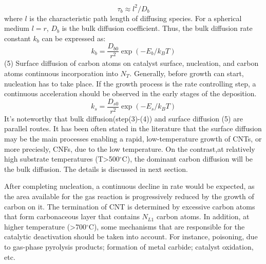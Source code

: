 \begin{equation}
\tau_{b} \approx l^{2} / D_{b}
\tag{3.2.5}
\end{equation}
where $l$ is the characteristic path length of diﬀusing species. For a spherical medium $l=r$,  $D_{b}$ is the bulk diﬀusion coefficient. Thus, the bulk diﬀusion rate constant $k_{b}$ can be expressed as:
\begin{equation}
k_{b}=\frac{D_{b 0}}{r^{2}} \exp \left(-E_{b} / k_{B} T\right)
\tag{3.2.6}
\end{equation}
(5) Surface diﬀusion of carbon atoms on catalyst surface, nucleation, and carbon atoms continuous incorporation into $N_{T}$. Generally, before growth can start, nucleation has to take place. If the growth process is the rate controlling step, a continuous acceleration should be observed in the early stages of the deposition. 
\begin{equation}
k_{s}=\frac{D_{s 0}}{r^{2}} \exp \left(-E_{s} / k_{B} T\right)
\tag{3.2.7}
\end{equation}
It’s noteworthy that bulk diffusion(step(3)-(4)) and surface diffusion (5) are parallel routes.  It has been often stated in the literature  that the surface diffusion may be the main processes enabling a rapid, low-temperature growth of CNTs, or more preciesly, CNFs, due to the low temperature. On the contrast,at relatively high substrate temperatures (T>500\(^\circ\)C), the dominant carbon diffusion will be the bulk diffusion. The details is discussed in next section. 

After completing nucleation, a continuous decline in rate would be expected, as the area available for the gas reaction is progressively reduced by the growth of carbon on it. The termination of CNT is determined by excessive carbon atoms that form carbonaceous layer that contains $N_{L1}$ carbon atoms. In addition, at higher temperature  (>700\(^\circ\)C), some mechanisms that are responsible for the catalytic deactivation should be taken into account. For instance, poisoning, due to gas-phase pyrolysis products; formation of metal carbide; catalyst oxidation, etc.
\\

